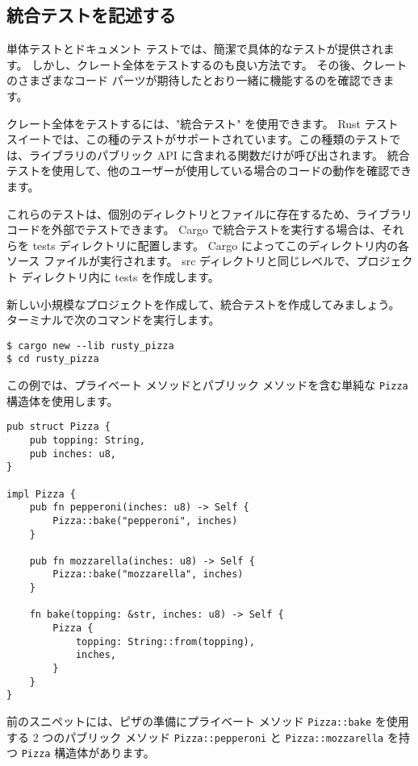 \subsection{統合テストを記述する}

単体テストとドキュメント テストでは、簡潔で具体的なテストが提供されます。 しかし、クレート全体をテストするのも良い方法です。 その後、クレートのさまざまなコード パーツが期待したとおり一緒に機能するのを確認できます。

クレート全体をテストするには、"統合テスト" を使用できます。 Rust テスト スイートでは、この種のテストがサポートされています。この種類のテストでは、ライブラリのパブリック API に含まれる関数だけが呼び出されます。 統合テストを使用して、他のユーザーが使用している場合のコードの動作を確認できます。

これらのテストは、個別のディレクトリとファイルに存在するため、ライブラリ コードを外部でテストできます。 Cargo で統合テストを実行する場合は、それらを tests ディレクトリに配置します。 Cargo によってこのディレクトリ内の各ソース ファイルが実行されます。 src ディレクトリと同じレベルで、プロジェクト ディレクトリ内に tests を作成します。

新しい小規模なプロジェクトを作成して、統合テストを作成してみましょう。 ターミナルで次のコマンドを実行します。

\begin{lstlisting}[numbers=none]
$ cargo new --lib rusty_pizza
$ cd rusty_pizza
\end{lstlisting}

この例では、プライベート メソッドとパブリック メソッドを含む単純な \texttt{Pizza} 構造体を使用します。

\begin{lstlisting}[numbers=none]
pub struct Pizza {
    pub topping: String,
    pub inches: u8,
}

impl Pizza {
    pub fn pepperoni(inches: u8) -> Self {
        Pizza::bake("pepperoni", inches)
    }

    pub fn mozzarella(inches: u8) -> Self {
        Pizza::bake("mozzarella", inches)
    }

    fn bake(topping: &str, inches: u8) -> Self {
        Pizza {
            topping: String::from(topping),
            inches,
        }
    }
}
\end{lstlisting}

前のスニペットには、ピザの準備にプライベート メソッド \texttt{Pizza::bake} を使用する 2 つのパブリック メソッド \texttt{Pizza::pepperoni} と \texttt{Pizza::mozzarella} を持つ \texttt{Pizza} 構造体があります。

